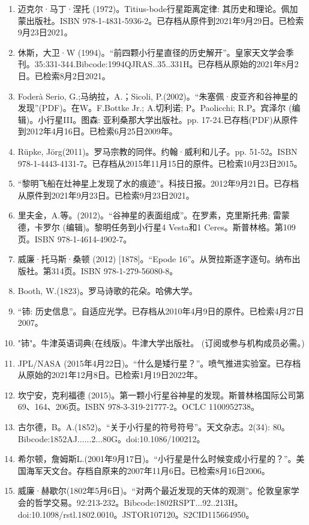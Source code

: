 \begin{enumerate}
\item 迈克尔·马丁·涅托 (1972)。Titius-bode行星距离定律: 其历史和理论。佩加蒙出版社。ISBN 978-1-4831-5936-2。已存档从原件到2021年9月29日。已检索9月23日2021。
\item 休斯，大卫·W (1994)。“前四颗小行星直径的历史解开”。皇家天文学会季刊。35:331-344.Bibcode:1994QJRAS..35..331H。已存档从原始的2021年8月2日。已检索8月2日2021。
\item Foderà Serio, G.;马纳拉，A.；Sicoli, P.(2002)。“朱塞佩·皮亚齐和谷神星的发现”(PDF)。在W。F.Bottke Jr.; A.切利诺; P。Paolicchi; R.P。宾泽尔 (编辑)。小行星III。图森: 亚利桑那大学出版社。pp. 17-24.已存档(PDF)从原件到2012年4月16日。已检索6月25日2009年。
\item Rüpke, Jörg(2011)。罗马宗教的同伴。约翰·威利和儿子。pp. 51-52。ISBN 978-1-4443-4131-7。已存档从2015年11月15日的原件。已检索10月23日2015。
\item “黎明飞船在灶神星上发现了水的痕迹”。科技日报。2012年9月21日。已存档从原件到2021年9月23日。已检索9月23日2021。
\item 里夫金，A.等。(2012)。“谷神星的表面组成”。在罗素，克里斯托弗; 雷蒙德，卡罗尔 (编辑)。黎明任务到小行星4 Vesta和1 Ceres。斯普林格。第109页。ISBN 978-1-4614-4902-7。
\item 威廉·托马斯·桑顿 (2012) [1878]。“Epode 16”。从贺拉斯逐字逐句。纳布出版社。第314页。ISBN 978-1-279-56080-8。
\item Booth, W.(1823)。罗马诗歌的花朵。哈佛大学。
\item “铈: 历史信息”。自适应光学。已存档从2010年4月9日的原件。已检索4月27日2007。
\item "铈"。牛津英语词典(在线版)。牛津大学出版社。 (订阅或参与机构成员必需。)
\item JPL/NASA (2015年4月22日)。“什么是矮行星？”。喷气推进实验室。已存档从原始的2021年12月8日。已检索1月19日2022年。
\item 坎宁安，克利福德 (2015)。第一颗小行星谷神星的发现。斯普林格国际公司第69、164、206页。ISBN 978-3-319-21777-2。OCLC 1100952738。
\item 古尔德，B。A.(1852)。“关于小行星的符号符号”。天文杂志。2(34): 80。Bibcode:1852AJ......2...80G。doi:10.1086/100212。
\item 希尔顿，詹姆斯L.(2001年9月17日)。“小行星是什么时候变成小行星的？”。美国海军天文台。存档自原来的2007年11月6日。已检索8月16日2006。
\item 威廉·赫歇尔(1802年5月6日)。“对两个最近发现的天体的观测”。伦敦皇家学会的哲学交易。92:213-232。Bibcode:1802RSPT...92..213H。doi:10.1098/rstl.1802.0010。JSTOR107120。S2CID115664950。  

\end{enumerate}
